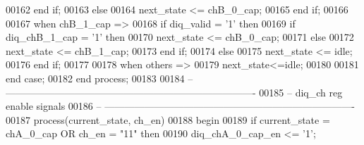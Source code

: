 \begin{DoxyCode}
00162             \textcolor{keywordflow}{end} \textcolor{keywordflow}{if};
00163          \textcolor{keywordflow}{else} 
00164             \textcolor{vhdlchar}{next_state} \textcolor{vhdlchar}{<=} \textcolor{vhdlchar}{chB\_0\_cap};
00165          \textcolor{keywordflow}{end} \textcolor{keywordflow}{if};
00166          
00167       \textcolor{keywordflow}{when} \textcolor{vhdlchar}{chB\_1\_cap} \textcolor{vhdlchar}{=}\textcolor{vhdlchar}{>}
00168          \textcolor{keywordflow}{if} \textcolor{vhdlchar}{diq_valid} \textcolor{vhdlchar}{=} \textcolor{vhdlchar}{'}\textcolor{vhdllogic}{}\textcolor{vhdllogic}{1}\textcolor{vhdlchar}{'} \textcolor{keywordflow}{then}         
00169             \textcolor{keywordflow}{if} \textcolor{vhdlchar}{diq_chB_1_cap} \textcolor{vhdlchar}{=} \textcolor{vhdlchar}{'}\textcolor{vhdllogic}{}\textcolor{vhdllogic}{1}\textcolor{vhdlchar}{'} \textcolor{keywordflow}{then}
00170                \textcolor{vhdlchar}{next_state} \textcolor{vhdlchar}{<=} \textcolor{vhdlchar}{chB\_0\_cap};              
00171             \textcolor{keywordflow}{else} 
00172                \textcolor{vhdlchar}{next_state} \textcolor{vhdlchar}{<=} \textcolor{vhdlchar}{chB\_1\_cap};
00173             \textcolor{keywordflow}{end} \textcolor{keywordflow}{if};
00174          \textcolor{keywordflow}{else}
00175             \textcolor{vhdlchar}{next_state} \textcolor{vhdlchar}{<=} \textcolor{vhdlchar}{idle};
00176          \textcolor{keywordflow}{end} \textcolor{keywordflow}{if};
00177       
00178         \textcolor{keywordflow}{when} \textcolor{keywordflow}{others} \textcolor{vhdlchar}{=}\textcolor{vhdlchar}{>} 
00179             \textcolor{vhdlchar}{next_state}\textcolor{vhdlchar}{<=}\textcolor{vhdlchar}{idle};
00180          
00181     \textcolor{keywordflow}{end} \textcolor{keywordflow}{case};
00182 \textcolor{keywordflow}{end} \textcolor{keywordflow}{process};
00183 
00184 \textcolor{keyword}{-- ----------------------------------------------------------------------------}
00185 \textcolor{keyword}{-- diq\_ch reg enable signals}
00186 \textcolor{keyword}{-- ----------------------------------------------------------------------------}
00187 \textcolor{keywordflow}{process}(current_state, ch_en)
00188 \textcolor{vhdlkeyword}{begin }
00189    \textcolor{keywordflow}{if} \textcolor{vhdlchar}{current_state} \textcolor{vhdlchar}{=} \textcolor{vhdlchar}{chA\_0\_cap} \textcolor{keywordflow}{OR} \textcolor{vhdlchar}{ch_en} \textcolor{vhdlchar}{=} \textcolor{vhdllogic}{"11"} \textcolor{keywordflow}{then} 
00190       \textcolor{vhdlchar}{diq_chA_0_cap_en} \textcolor{vhdlchar}{<=} \textcolor{vhdlchar}{'}\textcolor{vhdllogic}{}\textcolor{vhdllogic}{1}\textcolor{vhdlchar}{'};

\end{DoxyCode}
